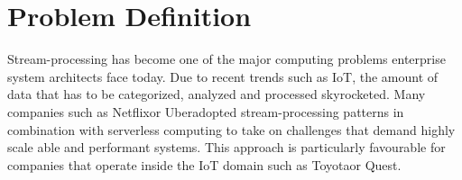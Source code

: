 \section{Problem Definition}

Stream-processing has become one of the major computing problems enterprise system architects face today. Due to recent trends such as IoT, the amount of data that has to be categorized, analyzed and processed skyrocketed. 
Many companies such as Netflix\footnotemark or Uber\footnotemark adopted stream-processing patterns in combination with serverless computing to take on challenges that demand highly scale able and performant systems. 
This approach is particularly favourable for companies that operate inside the IoT domain such as Toyota\footnotemark or Quest\footnotemark.

